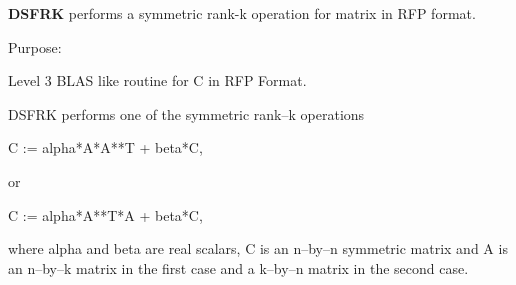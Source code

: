 {\bfseries D\+S\+F\+R\+K} performs a symmetric rank-\/k operation for matrix in R\+F\+P format. 

 \begin{DoxyParagraph}{Purpose\+: }
\begin{DoxyVerb} Level 3 BLAS like routine for C in RFP Format.

 DSFRK performs one of the symmetric rank--k operations

    C := alpha*A*A**T + beta*C,

 or

    C := alpha*A**T*A + beta*C,

 where alpha and beta are real scalars, C is an n--by--n symmetric
 matrix and A is an n--by--k matrix in the first case and a k--by--n
 matrix in the second case.\end{DoxyVerb}
 
\end{DoxyParagraph}

